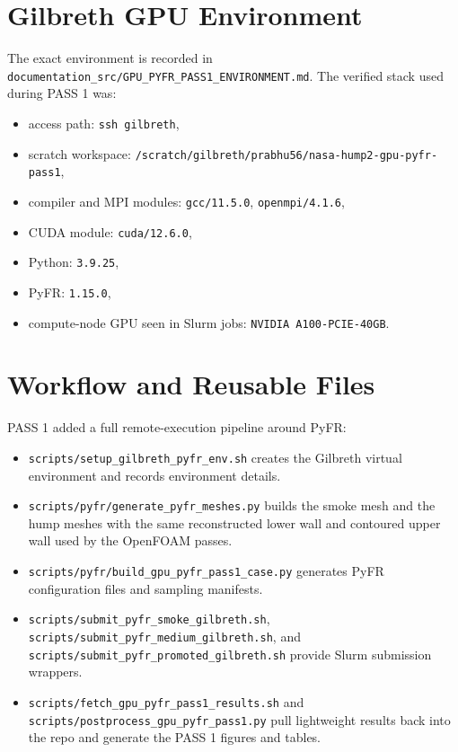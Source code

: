 \documentclass[11pt]{article}
\begin{document}
\section{Gilbreth GPU Environment}
The exact environment is recorded in \texttt{documentation\_src/GPU\_PYFR\_PASS1\_ENVIRONMENT.md}. The verified stack used during PASS 1 was:
\begin{itemize}
  \item access path: \texttt{ssh gilbreth},
  \item scratch workspace: \texttt{/scratch/gilbreth/prabhu56/nasa-hump2-gpu-pyfr-pass1},
  \item compiler and MPI modules: \texttt{gcc/11.5.0}, \texttt{openmpi/4.1.6},
  \item CUDA module: \texttt{cuda/12.6.0},
  \item Python: \texttt{3.9.25},
  \item PyFR: \texttt{1.15.0},
  \item compute-node GPU seen in Slurm jobs: \texttt{NVIDIA A100-PCIE-40GB}.
\end{itemize}

\section{Workflow and Reusable Files}
PASS 1 added a full remote-execution pipeline around PyFR:
\begin{itemize}
  \item \texttt{scripts/setup\_gilbreth\_pyfr\_env.sh} creates the Gilbreth virtual environment and records environment details.
  \item \texttt{scripts/pyfr/generate\_pyfr\_meshes.py} builds the smoke mesh and the hump meshes with the same reconstructed lower wall and contoured upper wall used by the OpenFOAM passes.
  \item \texttt{scripts/pyfr/build\_gpu\_pyfr\_pass1\_case.py} generates PyFR configuration files and sampling manifests.
  \item \texttt{scripts/submit\_pyfr\_smoke\_gilbreth.sh}, \texttt{scripts/submit\_pyfr\_medium\_gilbreth.sh}, and \texttt{scripts/submit\_pyfr\_promoted\_gilbreth.sh} provide Slurm submission wrappers.
  \item \texttt{scripts/fetch\_gpu\_pyfr\_pass1\_results.sh} and \texttt{scripts/postprocess\_gpu\_pyfr\_pass1.py} pull lightweight results back into the repo and generate the PASS 1 figures and tables.
\end{itemize}
\end{document}
